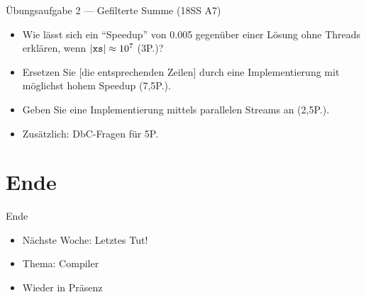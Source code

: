 \documentclass{beamer}
\begin{document}
\begin{frame}{Übungsaufgabe 2 --- Gefilterte Summe (18SS A7)}

	\begin{itemize}
		\item Wie lässt sich ein \enquote{Speedup} von 0.005 gegenüber einer Lösung ohne Threads erklären, wenn $|\textrm{\texttt{xs}}| \approx 10^7$ (3P.)?
		\item Ersetzen Sie [die entsprechenden Zeilen] durch eine Implementierung mit möglichst hohem Speedup (7,5P.).
		\item Geben Sie eine Implementierung mittels parallelen Streams an (2,5P.).
		\item Zusätzlich: DbC-Fragen für 5P.
	\end{itemize}
\end{frame}

\section{Ende}

\begin{frame}{Ende}
	\begin{itemize}
		\item Nächste Woche: Letztes Tut!
		\item Thema: Compiler
		\item Wieder in Präsenz
	\end{itemize}
\end{frame}
\end{document}
